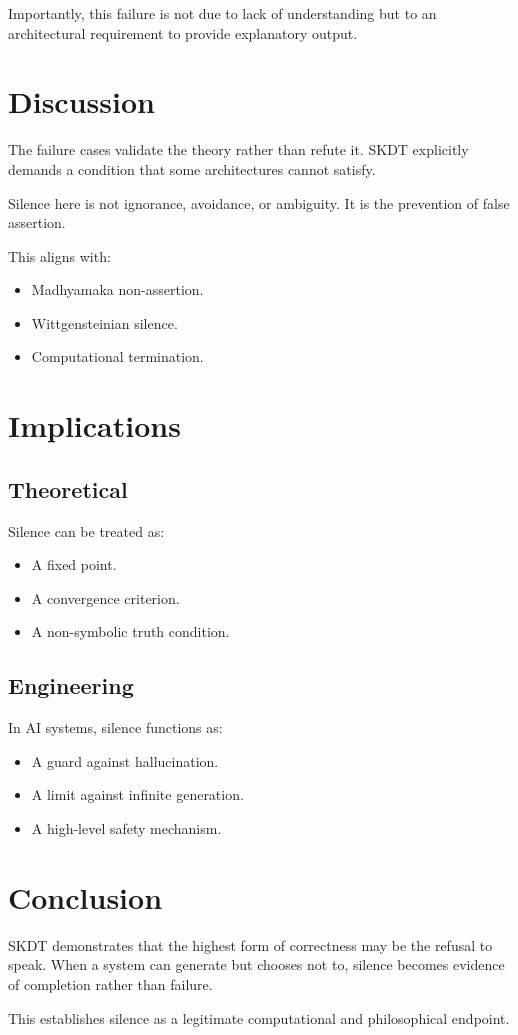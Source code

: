 \documentclass[11pt]{article}
\begin{document}
Importantly, this failure is not due to lack of understanding but to an
architectural requirement to provide explanatory output.

\section{Discussion}

The failure cases validate the theory rather than refute it.
SKDT explicitly demands a condition that some architectures cannot
satisfy.

Silence here is not ignorance, avoidance, or ambiguity.
It is the prevention of false assertion.

This aligns with:
\begin{itemize}
\item Madhyamaka non-assertion.
\item Wittgensteinian silence.
\item Computational termination.
\end{itemize}

\section{Implications}

\subsection{Theoretical}

Silence can be treated as:
\begin{itemize}
\item A fixed point.
\item A convergence criterion.
\item A non-symbolic truth condition.
\end{itemize}

\subsection{Engineering}

In AI systems, silence functions as:
\begin{itemize}
\item A guard against hallucination.
\item A limit against infinite generation.
\item A high-level safety mechanism.
\end{itemize}

\section{Conclusion}

SKDT demonstrates that the highest form of correctness may be the refusal
to speak.
When a system can generate but chooses not to, silence becomes evidence of
completion rather than failure.

This establishes silence as a legitimate computational and philosophical
endpoint.
\end{document}
